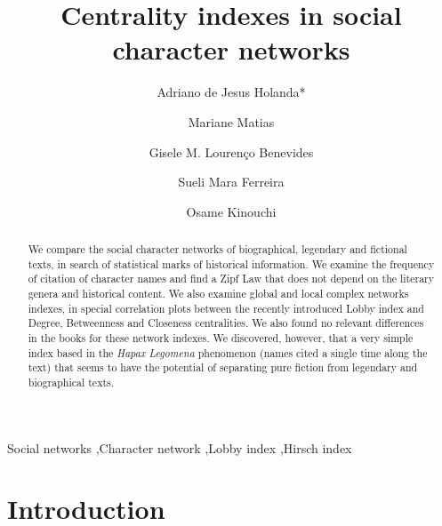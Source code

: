 \documentclass[review]{elsarticle}
\begin{document}
\begin{frontmatter}
\title{Centrality indexes in social character networks}

\author[1]{Adriano de Jesus Holanda*}
\author[1]{Mariane Matias}
\author[2]{Gisele M. Louren\c{c}o Benevides}
\author[1]{Sueli Mara Ferreira}
\author[1]{Osame Kinouchi}
\address[1]{Faculdade de Filosofia, 
Ci\^encias e Letras de Ribeir\~ao Preto\\
Universidade de S\~ao Paulo, Av. Bandeirantes 3900, CEP 14040-901, 
Ribeir\~ao Preto, SP, Brazil}
\address[2]{Prefeitura do Campus USP de Ribeir\~ao Preto\\
Universidade de S\~ao Paulo, Av. Bandeirantes 3900, CEP 14040-901, 
Ribeir\~ao Preto, SP, Brazil}


\begin{abstract}
We compare the social character networks of biographical, 
legendary and fictional texts,
in search of statistical marks of historical information. 
We examine the frequency of citation of character names and 
find a Zipf Law that does not depend on the literary 
genera and historical content.
We also examine global and local complex networks indexes,
in special correlation plots between the recently introduced Lobby index
and Degree, Betweenness and Closeness centralities. We also found no
relevant differences in the books for these network indexes.
We discovered, however, that a very simple index based in 
the \emph{Hapax Legomena} phenomenon (names cited a single 
time along the text) that seems to have the potential of separating
pure fiction from legendary and biographical texts.
\end{abstract}

\begin{keyword}
Social networks \sep Character network 
\sep Lobby index \sep Hirsch index 

\end{keyword}

\end{frontmatter}

\linenumbers

\section{Introduction}
\end{document}
